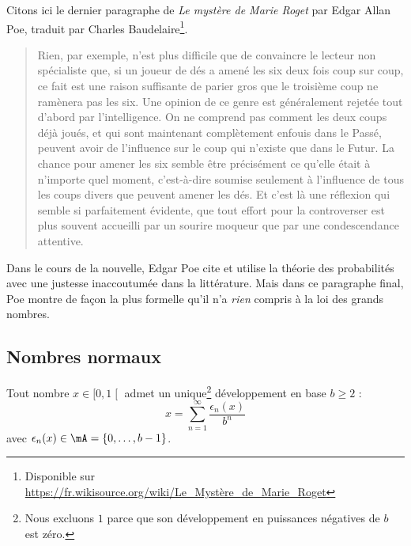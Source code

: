 \begin{example}
    Citons ici le dernier paragraphe de \emph{Le mystère de Marie Roget} par Edgar Allan Poe, traduit par Charles Baudelaire\footnote{Disponible sur \url{https://fr.wikisource.org/wiki/Le_Mystère_de_Marie_Roget}}.

    \begin{quote}
Rien, par exemple, n’est plus difficile que de convaincre le lecteur non spécialiste que, si un joueur de dés a amené les six deux fois coup sur coup, ce fait est une raison suffisante de parier gros que le troisième coup ne ramènera pas les six. Une opinion de ce genre est généralement rejetée tout d’abord par l’intelligence. On ne comprend pas comment les deux coups déjà joués, et qui sont maintenant complètement enfouis dans le Passé, peuvent avoir de l’influence sur le coup qui n’existe que dans le Futur. La chance pour amener les six semble être précisément ce qu’elle était à n’importe quel moment, c’est-à-dire soumise seulement à l’influence de tous les coups divers que peuvent amener les dés. Et c’est là une réflexion qui semble si parfaitement évidente, que tout effort pour la controverser est plus souvent accueilli par un sourire moqueur que par une condescendance attentive. 
    \end{quote}
    Dans le cours de la nouvelle, Edgar Poe cite et utilise la théorie des probabilités avec une justesse inaccoutumée dans la littérature. Mais dans ce paragraphe final, Poe montre de façon la plus formelle qu'il n'a \emph{rien} compris à la loi des grands nombres.
\end{example}

\subsection{Nombres normaux}

Tout nombre \( x\in \mathopen[ 0 , 1 \mathclose[\) admet un unique\footnote{Nous excluons \( 1\) parce que son développement en puissances négatives de \( b\) est zéro.} développement en base \( b\geq 2\) :
\begin{equation}
    x=\sum_{n=1}^{\infty}\frac{ \epsilon_n(x) }{ b^n }
\end{equation}
avec \( \epsilon_n(x)\in\mA=\{ 0,\ldots, b-1 \}\).

